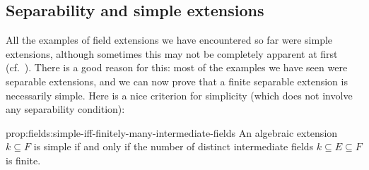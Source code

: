 \subsection{Separability and simple extensions}
\label{subsec:fields:separability-and-simple-extensions}
All the examples of field extensions we have encountered so far were
simple extensions, although sometimes this may not be completely
apparent at first (cf.\ ). There is a good
reason for this: most of the examples we have seen were separable
extensions, and we can now prove that a finite separable extension is
necessarily simple. Here is a nice criterion for simplicity (which
does not involve any separability condition):
\begin{prop}{}{prop:fields:simple-iff-finitely-many-intermediate-fields}
  An algebraic extension $k \subseteq F$ is simple if and only if the
  number of distinct intermediate fields $k \subseteq E \subseteq F$
  is finite.
\end{prop}
